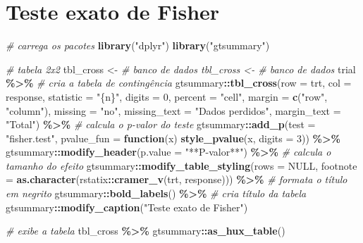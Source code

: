 \documentclass[
  a4paper,
]{book}
\newenvironment{Shaded}{\begin{snugshade}}{\end{snugshade}}
\newcommand{\AttributeTok}[1]{\textcolor[rgb]{0.13,0.29,0.53}{#1}}
\newcommand{\CommentTok}[1]{\textcolor[rgb]{0.56,0.35,0.01}{\textit{#1}}}
\newcommand{\ConstantTok}[1]{\textcolor[rgb]{0.56,0.35,0.01}{#1}}
\newcommand{\ControlFlowTok}[1]{\textcolor[rgb]{0.13,0.29,0.53}{\textbf{#1}}}
\newcommand{\DecValTok}[1]{\textcolor[rgb]{0.00,0.00,0.81}{#1}}
\newcommand{\FunctionTok}[1]{\textcolor[rgb]{0.13,0.29,0.53}{\textbf{#1}}}
\newcommand{\NormalTok}[1]{#1}
\newcommand{\OtherTok}[1]{\textcolor[rgb]{0.56,0.35,0.01}{#1}}
\newcommand{\SpecialCharTok}[1]{\textcolor[rgb]{0.81,0.36,0.00}{\textbf{#1}}}
\newcommand{\StringTok}[1]{\textcolor[rgb]{0.31,0.60,0.02}{#1}}
\begin{document}
\hypertarget{teste-exato-de-fisher}{%
\section{Teste exato de Fisher}\label{teste-exato-de-fisher}}

\begin{Shaded}
\begin{Highlighting}[]
\CommentTok{\# carrega os pacotes}
\FunctionTok{library}\NormalTok{(}\StringTok{"dplyr"}\NormalTok{)}
\FunctionTok{library}\NormalTok{(}\StringTok{"gtsummary"}\NormalTok{)}

\CommentTok{\# tabela 2x2}
\NormalTok{tbl\_cross }\OtherTok{\textless{}{-}} \CommentTok{\# banco de dados tbl\_cross \textless{}{-} \# banco de dados}
\NormalTok{trial }\SpecialCharTok{\%\textgreater{}\%}
    \CommentTok{\# cria a tabela de contingência}
\NormalTok{gtsummary}\SpecialCharTok{::}\FunctionTok{tbl\_cross}\NormalTok{(}\AttributeTok{row =}\NormalTok{ trt, }\AttributeTok{col =}\NormalTok{ response, }\AttributeTok{statistic =} \StringTok{"\{n\}"}\NormalTok{, }\AttributeTok{digits =} \DecValTok{0}\NormalTok{, }\AttributeTok{percent =} \StringTok{"cell"}\NormalTok{,}
    \AttributeTok{margin =} \FunctionTok{c}\NormalTok{(}\StringTok{"row"}\NormalTok{, }\StringTok{"column"}\NormalTok{), }\AttributeTok{missing =} \StringTok{"no"}\NormalTok{, }\AttributeTok{missing\_text =} \StringTok{"Dados perdidos"}\NormalTok{,}
    \AttributeTok{margin\_text =} \StringTok{"Total"}\NormalTok{) }\SpecialCharTok{\%\textgreater{}\%}
    \CommentTok{\# calcula o p{-}valor do teste}
\NormalTok{gtsummary}\SpecialCharTok{::}\FunctionTok{add\_p}\NormalTok{(}\AttributeTok{test =} \StringTok{"fisher.test"}\NormalTok{, }\AttributeTok{pvalue\_fun =} \ControlFlowTok{function}\NormalTok{(x) }\FunctionTok{style\_pvalue}\NormalTok{(x, }\AttributeTok{digits =} \DecValTok{3}\NormalTok{)) }\SpecialCharTok{\%\textgreater{}\%}
\NormalTok{    gtsummary}\SpecialCharTok{::}\FunctionTok{modify\_header}\NormalTok{(}\AttributeTok{p.value =} \StringTok{"**P{-}valor**"}\NormalTok{) }\SpecialCharTok{\%\textgreater{}\%}
    \CommentTok{\# calcula o tamanho do efeito}
\NormalTok{gtsummary}\SpecialCharTok{::}\FunctionTok{modify\_table\_styling}\NormalTok{(}\AttributeTok{rows =} \ConstantTok{NULL}\NormalTok{, }\AttributeTok{footnote =} \FunctionTok{as.character}\NormalTok{(rstatix}\SpecialCharTok{::}\FunctionTok{cramer\_v}\NormalTok{(trt,}
\NormalTok{    response))) }\SpecialCharTok{\%\textgreater{}\%}
    \CommentTok{\# formata o título em negrito}
\NormalTok{gtsummary}\SpecialCharTok{::}\FunctionTok{bold\_labels}\NormalTok{() }\SpecialCharTok{\%\textgreater{}\%}
    \CommentTok{\# cria título da tabela}
\NormalTok{gtsummary}\SpecialCharTok{::}\FunctionTok{modify\_caption}\NormalTok{(}\StringTok{"Teste exato de Fisher"}\NormalTok{)}

\CommentTok{\# exibe a tabela}
\NormalTok{tbl\_cross }\SpecialCharTok{\%\textgreater{}\%}
\NormalTok{    gtsummary}\SpecialCharTok{::}\FunctionTok{as\_hux\_table}\NormalTok{()}
\end{Highlighting}
\end{Shaded}
\end{document}
